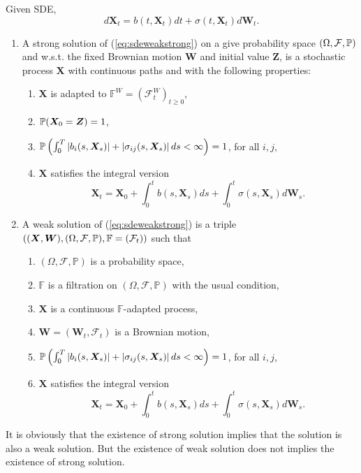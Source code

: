 \begin{defn}
    Given SDE,
    \begin{equation}\label{eq:sdeweakstrong}
        d\bm{X}_t = b(t,\bm{X}_t)dt+\sigma(t,\bm{X}_t)d\bm{W}_t.
    \end{equation}
    \begin{enumerate}[label=(\arabic{*})]
        \item A strong solution of (\ref{eq:sdeweakstrong}) on a give probability space $(\Omega,\mathcal{F},\mathbb{P})$ and w.s.t. the fixed Brownian motion $\bm{W}$ and initial value $\bm{Z}$, is a stochastic process $\bm{X}$ with continuous paths and with the following properties:
        \begin{enumerate}[label=(\roman*)]
            \item $\bm{X}$ is adapted to $\mathbb{F}^W = (\mathcal{F}^W_t)_{t \geq 0}$,
            \item $\mathbb{P}(\bm{X}_0 = \bm{Z}) = 1$,
            \item $\mathbb{P}\left(\int_0^T \left\lvert b_i(s,\bm{X}_s)\right\lvert + \left\lvert\sigma_{ij}(s,\bm{X}_s)\right\lvert ds < \infty\right) = 1$, for all $i,j$,
            \item $\bm{X}$ satisfies the integral version
            \begin{equation*}
                \bm{X}_t = \bm{X}_0 + \int_0^tb(s,\bm{X}_s)ds+\int_0^t\sigma(s,\bm{X}_s)d\bm{W}_s.
            \end{equation*}
        \end{enumerate}

        \item A weak solution of (\ref{eq:sdeweakstrong}) is a triple $\left((\bm{X},\bm{W}),(\Omega,\mathcal{F},\mathbb{P}), \mathbb{F}=(\mathcal{F}_t)\right)$ such that
        \begin{enumerate}[label=(\roman*)]
            \item $(\Omega,\mathcal{F},\mathbb{P})$ is a probability space,
            \item $\mathbb{F}$ is a filtration on $(\Omega,\mathcal{F},\mathbb{P})$ with the usual condition,
            \item $\bm{X}$ is a continuous $\mathbb{F}$-adapted process,
            \item $\bm{W} = (\bm{W}_t,\mathcal{F}_t)$ is a Brownian motion,
            \item $\mathbb{P}\left(\int_0^T \left\lvert b_i(s,\bm{X}_s)\right\lvert + \left\lvert\sigma_{ij}(s,\bm{X}_s)\right\lvert ds < \infty\right) = 1$, for all $i,j$,
            \item $\bm{X}$ satisfies the integral version
            \begin{equation*}
                \bm{X}_t = \bm{X}_0 + \int_0^tb(s,\bm{X}_s)ds+\int_0^t\sigma(s,\bm{X}_s)d\bm{W}_s.
            \end{equation*}
        \end{enumerate}
    \end{enumerate}
\end{defn}
\begin{rmk}
    It is obviously that the existence of strong solution implies that the solution is also a weak solution. But the existence of weak solution does not implies the existence of strong solution.
\end{rmk}

